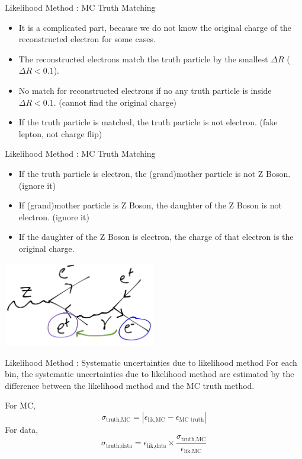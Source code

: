 \documentclass[mathserif,serif]{beamer}
\begin{document}
\begin{frame}{Likelihood Method : MC Truth Matching}
\begin{itemize}
\item It is a complicated part, because we do not know the original charge of the reconstructed electron for some cases.
\item The reconstructed electrons match the truth particle by the smallest $\Delta R$ ($\Delta R < 0.1$).
\item No match for reconstructed electrons if no any truth particle is inside $\Delta R < 0.1$. (cannot find the original charge)
\item If the truth particle is matched, the truth particle is not electron. (fake lepton, not charge flip)
\end{itemize}
\end{frame}

\begin{frame}{Likelihood Method : MC Truth Matching}
\begin{itemize}
\item If the truth particle is electron, the (grand)mother particle is not Z Boson. (ignore it)
\item If (grand)mother particle is Z Boson, the daughter of the Z Boson is not electron.  (ignore it)
\item If the daughter of the Z Boson is electron, the charge of that electron is the original charge.
\end{itemize}
\centering
\includegraphics[width=0.5\textwidth]{data/photo/charge_flip/MC-truth.png}
\end{frame}

\begin{frame}{Likelihood Method : Systematic uncertainties due to likelihood method}
For each bin, the systematic uncertainties due to likelihood method are estimated by the difference between the likelihood method and the MC truth method.

For MC,
\begin{equation*}
\sigma_{\text{truth,MC}} = | \epsilon_{\text{lik,MC}} - \epsilon_{\text{MC truth}} |
\end{equation*}
For data,
\begin{equation*}
\sigma_{\text{truth,data}} = \epsilon_{\text{lik,data}} \times \frac{\sigma_{\text{truth,MC}}}{\epsilon_{\text{lik,MC}}}
\end{equation*}
\end{frame}
\end{document}
